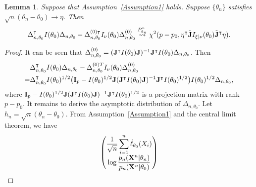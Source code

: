 \documentclass[11pt]{article}
\newcommand{\myT}{\intercal}
\theoremstyle{plain}
\newtheorem{lemma}{\quad\quad Lemma}
\theoremstyle{definition}
\theoremstyle{remark}
\begin{document}
\begin{appendices}
    \begin{lemma}
        Suppose that Assumption~\ref{Assumption1} holds.
        Suppose $\{\theta_n\}$ satisfies $\sqrt{n}(\theta_n-\theta_0)\to \eta$.
        Then
        \begin{align*}
        \Delta_{n,\theta_0}^\myT  I(\theta_0)\Delta_{n,\theta_0}
            -
            \Delta_{n,\theta_0}^{{(0)}\myT} I_{\nu}(\theta_0)\Delta^{(0)}_{n,\theta_0}
\overset{P^n_{\theta_n}}{\rightsquigarrow}
    \chi^2 (p-p_0, \eta^\myT\tilde \BJ I_{\xi|\nu}(\theta_0) \tilde\BJ^\myT\eta )
.
        \end{align*}
        \label{lemma:score}
    \end{lemma}
    \begin{proof}
        It can be seen that $\Delta_{n,\theta_0}^{(0)}=(\BJ^\myT  I(\theta_0)\BJ)^{-1} \BJ^\myT  I(\theta_0) \Delta_{n,\theta_0}$.
Then
\begin{equation*}
    \begin{split}
        &
        \Delta_{n,\theta_0}^\myT  I(\theta_0) \Delta_{n,\theta_0}
    -
    \Delta_{n,\theta_0}^{{(0)}T} I_{\nu}(\theta_0) \Delta^{(0)}_{n,\theta_0}
            \\
            =&
            \Delta_{n,\theta_0}^\myT  I(\theta_0)^{1/2}\big(
            \BI_p-
            I(\theta_0)^{1/2} \BJ (\BJ^\myT  I(\theta_0) \BJ)^{-1} \BJ^\myT  I(\theta_0)^{1/2}
        \big)I(\theta_0)^{1/2}\Delta_{n,\theta_0},
    \end{split}
\end{equation*}
where $
            \BI_p-
            I(\theta_0)^{1/2} \BJ (\BJ^\myT  I(\theta_0) \BJ)^{-1} \BJ^\myT  I(\theta_0)^{1/2}
$
is a projection matrix with rank $p-p_0$.
It remains to derive the asymptotic distribution of $\Delta_{n,\theta_0}$.
Let $h_n=\sqrt{n}(\theta_n-\theta_0)$.
     From Assumption~\ref{Assumption1} and the central limit theorem, we have
\begin{equation*}
    \begin{split}
    \left(
    \begin{matrix}
        \displaystyle
        \frac{1}{\sqrt{n}}\sum^n_{i=1}\dot{\ell}_{\theta_0}(X_i)
        \\
        \displaystyle
        \log \frac{p_n(\BX^{n}|\theta_n)}{p_n(\BX^{n}|\theta_0)}
    \end{matrix}
    \right)

\end{split}
\end{equation*}
\end{proof}
\end{appendices}
\end{document}
